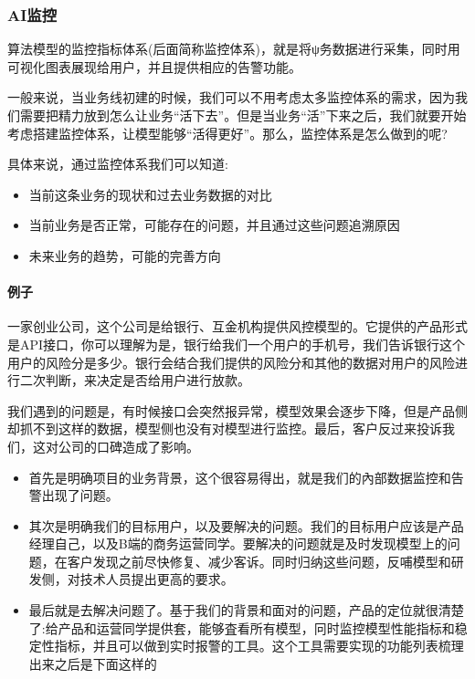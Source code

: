 \documentclass[letterpaper,10pt,english]{sphinxmanual}
\begin{document}
\subsubsection{AI监控}
\label{\detokenize{chapter_AI_dive/AI_monitor_control:ai}}\label{\detokenize{chapter_AI_dive/AI_monitor_control::doc}}
算法模型的监控指标体系(后面简称监控体系)，就是将ψ务数据进行采集，同时用可视化图表展现给用户，并且提供相应的告警功能。

一般来说，当业务线初建的时候，我们可以不用考虑太多监控体系的需求，因为我们需要把精力放到怎么让业务“活下去”。但是当业务“活”下来之后，我们就要开始考虑搭建监控体系，让模型能够“活得更好”。那么，监控体系是怎么做到的呢?

具体来说，通过监控体系我们可以知道:
\begin{itemize}
\item {} 
当前这条业务的现状和过去业务数据的对比

\item {} 
当前业务是否正常，可能存在的问题，并且通过这些问题追溯原因

\item {} 
未来业务的趋势，可能的完善方向

\end{itemize}


\paragraph{例子}
\label{\detokenize{chapter_AI_dive/AI_monitor_control:id1}}
一家创业公司，这个公司是给银行、互金机构提供风控模型的。它提供的产品形式是API接口，你可以理解为是，银行给我们一个用户的手机号，我们告诉银行这个用户的风险分是多少。银行会结合我们提供的风险分和其他的数据对用户的风险进行二次判断，来决定是否给用户进行放款。

我们遇到的问题是，有时候接口会突然报异常，模型效果会逐步下降，但是产品侧却抓不到这样的数据，模型侧也没有对模型进行监控。最后，客户反过来投诉我们，这对公司的口碑造成了影响。
\begin{itemize}
\item {} 
首先是明确项目的业务背景，这个很容易得出，就是我们的內部数据监控和告警出现了问题。

\item {} 
其次是明确我们的目标用户，以及要解决的问题。我们的目标用户应该是产品经理自己，以及B端的商务运营同学。要解决的问题就是及时发现模型上的问题，在客户发现之前尽快修复、减少客诉。同时归纳这些问题，反哺模型和研发侧，对技术人员提出更高的要求。

\item {} 
最后就是去解决问题了。基于我们的背景和面对的问题，产品的定位就很清楚了:给产品和运营同学提供套，能够査看所有模型，冋时监控模型性能指标和稳定性指标，并且可以做到实时报警的工具。这个工具需要实现的功能列表梳理出来之后是下面这样的

\end{itemize}
\end{document}
